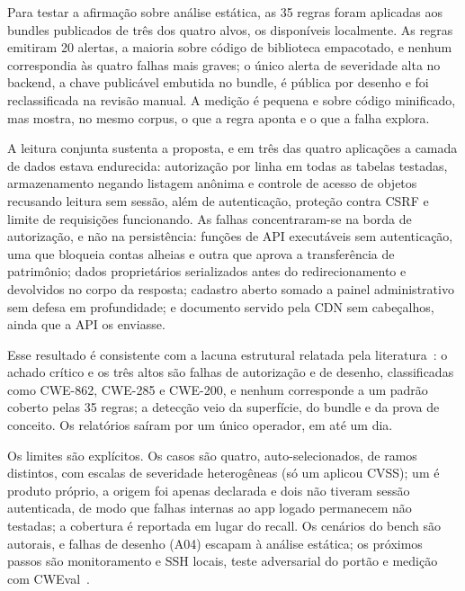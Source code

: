 \documentclass[12pt]{article}
\begin{document}
Para testar a afirmação sobre análise estática, as 35 regras foram aplicadas aos bundles
publicados de três dos quatro alvos, os disponíveis localmente. As regras emitiram 20
alertas, a maioria sobre código de biblioteca empacotado, e nenhum correspondia às quatro falhas
mais graves; o único alerta de severidade alta no backend, a chave publicável embutida no
bundle, é pública por desenho e foi reclassificada na revisão manual. A medição é pequena e
sobre código minificado, mas mostra, no mesmo corpus, o que a regra aponta e o que a falha
explora.

A leitura conjunta sustenta a proposta, e em três das quatro aplicações a
camada de dados estava endurecida: autorização por linha em todas as tabelas
testadas, armazenamento negando listagem anônima e controle de acesso de objetos recusando
leitura sem sessão, além de autenticação, proteção contra CSRF e limite de requisições
funcionando. As falhas concentraram-se na borda de autorização, e não na persistência: funções de API
executáveis sem autenticação, uma que bloqueia contas alheias e outra que aprova a
transferência de patrimônio; dados proprietários serializados antes do redirecionamento e
devolvidos no corpo da resposta; cadastro aberto somado a painel administrativo sem defesa em
profundidade; e documento servido pela CDN sem cabeçalhos, ainda que a API os enviasse.

Esse resultado é consistente com a lacuna estrutural relatada pela
literatura~\cite{blain2026broken}: o achado crítico e os três altos são falhas de autorização e
de desenho, classificadas como CWE-862, CWE-285 e CWE-200, e nenhum corresponde a um padrão
coberto pelas 35 regras; a detecção veio da superfície, do bundle e da prova de conceito. Os
relatórios saíram por um único operador, em até um dia.

Os limites são explícitos. Os casos são quatro, auto-selecionados, de ramos distintos, com escalas
de severidade heterogêneas (só um aplicou CVSS); um é produto próprio, a origem foi
apenas declarada e dois não tiveram sessão autenticada, de modo que falhas internas ao app logado
permanecem não testadas; a cobertura é reportada em lugar do recall. Os cenários do bench são
autorais, e falhas de desenho (A04) escapam à análise estática; os próximos passos são
monitoramento e SSH locais, teste adversarial do portão e medição com CWEval~\cite{peng2025cweval}.



\end{document}
